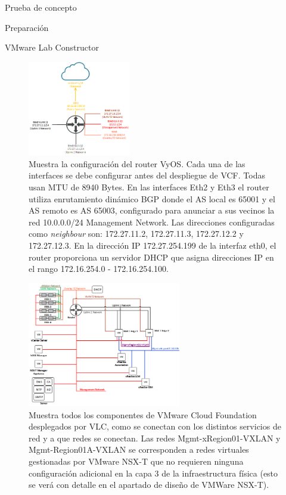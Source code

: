 \begin{section}{Prueba de concepto}
\begin{subsection}{Preparación}
\begin{subsubsection}{VMware Lab Constructor}
\begin{figure}[h]
      \label{fig:VMs-alojadas-host-fisico}
    \end{figure}
    \begin{figure}[h]
      \centering
      \includegraphics[width=0.4\textwidth]{imaxes/pruebaconcepto/RouterFisicoL3.png}
      \caption{Muestra la configuración del router VyOS. Cada una de las interfaces se debe configurar antes del despliegue de VCF. Todas usan MTU de 8940 Bytes. 
      En las interfaces Eth2 y Eth3 el router utiliza enrutamiento dinámico BGP donde el AS local es 65001 y el AS remoto es AS 65003, configurado para anunciar a sus vecinos la red 10.0.0.0/24 Management Network. Las direcciones configuradas como \textit{neighbour} son: 172.27.11.2, 172.27.11.3, 172.27.12.2 y 172.27.12.3. En la dirección IP 172.27.254.199 de la interfaz eth0, el router proporciona un servidor DHCP que asigna direcciones IP en el rango 172.16.254.0 - 172.16.254.100.}
      \label{fig:interfaces-router-fisico-L3}
    \end{figure}
    \begin{figure}[h]
      \centering
      \includegraphics[width=0.6\textwidth]{imaxes/pruebaconcepto/RedDesdeDentro.png}
      \caption{Muestra todos los componentes de VMware Cloud Foundation desplegados por VLC, como se conectan con los distintos servicios de red y a que redes se conectan. Las redes Mgmt-xRegion01-VXLAN y Mgmt-Region01A-VXLAN se corresponden a redes virtuales gestionadas por VMware NSX-T que no requieren ninguna configuración adicional en la capa 3 de la infraestructura física (esto se verá con detalle en el apartado de diseño de VMWare NSX-T).}
      \label{fig:red-L3-infraestructura-fisica}
    \end{figure}
    \FloatBarrier
  \end{subsubsection}
  

\end{subsection}
\end{section}
